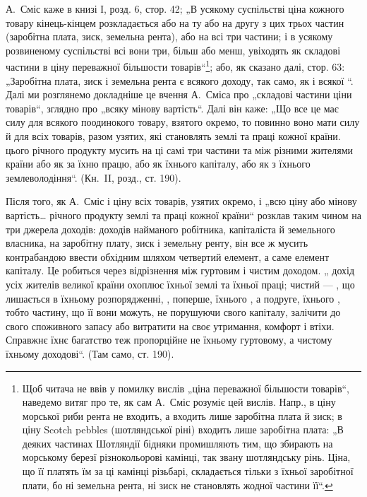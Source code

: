 А.~Сміс каже в книзі І, розд. 6, стор. 42; „В усякому суспільстві
ціна кожного товару кінець-кінцем розкладається або на ту або на другу
з цих трьох частин (заробітна плата, зиск, земельна рента), або на всі
три частини; і в усякому розвиненому суспільстві всі вони три, більш
або менш, увіходять як складові частини в ціну переважної більшости
товарів“\footnote{
Щоб читача не ввів у помилку вислів „ціна переважної більшости товарів“,
наведемо витяг про те, як сам А.~Сміс розуміє цей вислів. Напр., в ціну морської
риби рента не входить, а входить лише заробітна плата й зиск; в ціну Scotch
pebbles (шотляндської ріні) входить лише заробітна плата: „В деяких частинах
Шотляндії бідняки промишляють тим, що збирають на морському березї різнокольорові
камінці, так звану шотляндську рінь. Ціна, що її платять їм за ці камінці
різьбарі, складається тільки з їхньої заробітної плати, бо ні земельна рента, ні
зиск не становлять жодної частини її“.
}; або, як сказано далі, стор. 63: „Заробітна плата, зиск і земельна
рента є  всякого доходу, так само,
як і всякої “. Далі ми розглянемо докладніше це
вчення А.~Сміса про „складові частини ціни товарів“, зглядно про „всяку
мінову вартість“. Далі він каже: „Що все це має силу для всякого
поодинокого товару, взятого окремо, то повинно воно мати силу й для
всіх товарів, разом узятих, які становлять 
землі та праці кожної країни. 
цього річного продукту мусить  на ці самі три частини
та  між різними жителями країни або як  за
їхню працю, або як  їхнього капіталу, або як  з їхнього
землеволодіння“. (Кн.~II, розд., ст. 190).

Після того, як А.~Сміс і ціну всіх товарів, узятих окремо, і „всю ціну
або мінову вартість\dots{} річного продукту землі та праці кожної країни“
розклав таким чином на три джерела доходів: доходів найманого робітника,
капіталіста й земельного власника, на заробітну плату, зиск і земельну
ренту, він все ж мусить контрабандою ввести обхідним шляхом
четвертий елемент, а саме елемент капіталу. Це робиться через відрізнення
між гуртовим і чистим доходом. „ дохід усіх жителів великої
країни охоплює  їхньої землі та їхньої праці;
чистий  — , що лишається в їхньому розпорядженні,
, поперше, їхнього ,
а подруге, їхнього , тобто
частину, що її вони можуть, не порушуючи свого капіталу, залічити
до свого споживного запасу або витратити на своє утримання, комфорт
і втіхи. Справжнє їхнє багатство теж пропорційне не їхньому гуртовому,
а чистому їхньому доходові“. (Там само, ст. 190).

